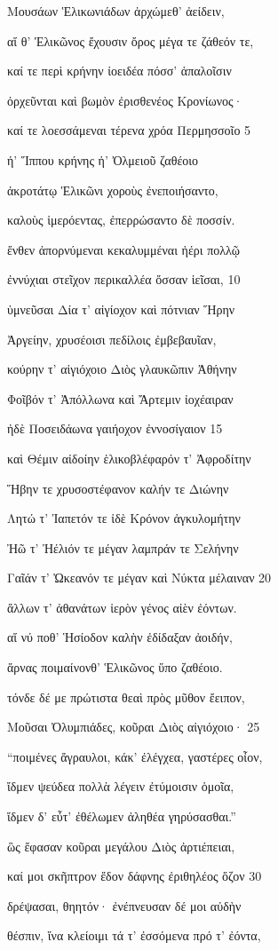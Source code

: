 Μουσάων Ἑλικωνιάδων ἀρχώμεθ' ἀείδειν,

αἵ θ' Ἑλικῶνος ἔχουσιν ὄρος μέγα τε ζάθεόν τε, 

καί τε περὶ κρήνην ἰοειδέα πόσσ' ἁπαλοῖσιν

ὀρχεῦνται καὶ βωμὸν ἐρισθενέος Κρονίωνος·

καί τε λοεσσάμεναι τέρενα χρόα Περμησσοῖο 5

ἠ' Ἵππου κρήνης ἠ' Ὀλμειοῦ ζαθέοιο

ἀκροτάτῳ Ἑλικῶνι χοροὺς ἐνεποιήσαντο,

καλοὺς ἱμερόεντας, ἐπερρώσαντο δὲ ποσσίν.

ἔνθεν ἀπορνύμεναι κεκαλυμμέναι ἠέρι πολλῷ 

ἐννύχιαι στεῖχον περικαλλέα ὄσσαν ἱεῖσαι, 10

ὑμνεῦσαι Δία τ' αἰγίοχον καὶ πότνιαν Ἥρην

Ἀργείην, χρυσέοισι πεδίλοις ἐμβεβαυῖαν, 

κούρην τ' αἰγιόχοιο Διὸς γλαυκῶπιν Ἀθήνην

Φοῖβόν τ' Ἀπόλλωνα καὶ Ἄρτεμιν ἰοχέαιραν

ἠδὲ Ποσειδάωνα γαιήοχον ἐννοσίγαιον 15 

καὶ Θέμιν αἰδοίην ἑλικοβλέφαρόν τ' Ἀφροδίτην

Ἥβην τε χρυσοστέφανον καλήν τε Διώνην

Λητώ τ' Ἰαπετόν τε ἰδὲ Κρόνον ἀγκυλομήτην

Ἠῶ τ' Ἠέλιόν τε μέγαν λαμπράν τε Σελήνην

Γαῖάν τ' Ὠκεανόν τε μέγαν καὶ Νύκτα μέλαιναν 20

ἄλλων τ' ἀθανάτων ἱερὸν γένος αἰὲν ἐόντων.

αἵ νύ ποθ' Ἡσίοδον καλὴν ἐδίδαξαν ἀοιδήν,

ἄρνας ποιμαίνονθ' Ἑλικῶνος ὕπο ζαθέοιο.

τόνδε δέ με πρώτιστα θεαὶ πρὸς μῦθον ἔειπον,

Μοῦσαι Ὀλυμπιάδες, κοῦραι Διὸς αἰγιόχοιο· 25 

``ποιμένες ἄγραυλοι, κάκ' ἐλέγχεα, γαστέρες οἶον,

ἴδμεν ψεύδεα πολλὰ λέγειν ἐτύμοισιν ὁμοῖα,

ἴδμεν δ' εὖτ' ἐθέλωμεν ἀληθέα γηρύσασθαι.''

ὣς ἔφασαν κοῦραι μεγάλου Διὸς ἀρτιέπειαι,

καί μοι σκῆπτρον ἔδον δάφνης ἐριθηλέος ὄζον 30

δρέψασαι, θηητόν· ἐνέπνευσαν δέ μοι αὐδὴν 

θέσπιν, ἵνα κλείοιμι τά τ' ἐσσόμενα πρό τ' ἐόντα, 

